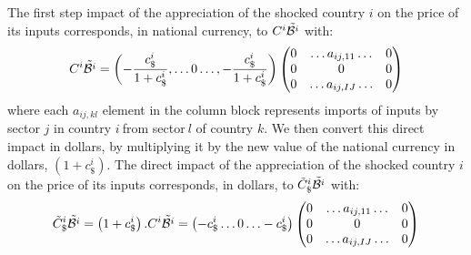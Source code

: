 \documentclass[11pt,a4paper]{article}
\begin{document}
The first step impact of the appreciation of the shocked country $i$ on the price of its inputs corresponds, in national currency, to $C^i{\tilde{{\cal B}^i}}$ with: 
\begin{eqnarray}
C^i{\tilde{{\cal B}^i}}=\left(-\frac{c_\$^i}{1+c_\$^i},\ldots0\ldots,-\frac{c_\$^i}{1+c_\$^i} \right)\left(\begin{matrix}0&\ldots{{{a}}_{ij,11}}\ldots&0\\0&0&0\\0&\ldots{{a}_{{ij,IJ}}}\ldots&0\\\end{matrix}\right) 
\label{eq:eq4}
 \end{eqnarray}
where each ${{{a}}_{{ij,kl}}}$ element in the column block represents imports of inputs by sector $j$ in country $i~$from sector$~l$ of country $k$.
We then convert this direct impact in dollars, by multiplying it by the new value of the national currency in dollars, $\left(1+c_\$^i\right)$. The direct impact of the appreciation of the shocked country $i$ on the price of its inputs corresponds, in dollars, to ${\tilde{C}_\$^i}{\tilde{{\cal B}^i}}$ with: 
\begin{eqnarray}
{\tilde{C}_\$^i}{\tilde{{\cal B}^i}}=\left(1+c_\$^i\right).C^i{\tilde{{\cal B}^i}}=
\left(-c_\$^i\ldots0\ldots-c_\$^i\right)\left(\begin{matrix}0&\ldots{{{a}}_{ij,11}}\ldots&0\\0&0&0\\0&\ldots{{a}_{{ij,IJ}}}\ldots&0\\\end{matrix}\right) 
\label{eq:eq4}
 \end{eqnarray}



\end{document}
